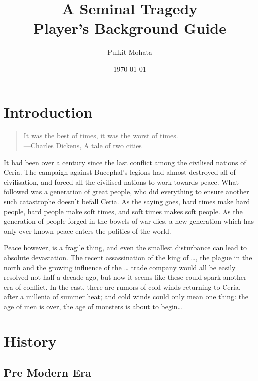 \documentclass[11pt]{article}
\author{Pulkit Mohata}
\date{\today}
\title{A Seminal Tragedy\\\medskip
\large Player's Background Guide}
\begin{document}
\maketitle
\tableofcontents

\section{Introduction}
\label{sec:org875150f}
\begin{quote}
It was the best of times, it was the worst of times. \\
---Charles Dickens, A tale of two cities
\end{quote}
It had been over a century since the last conflict among the civilised nations of Ceria. The campaign against Bucephal's legions had almost destroyed all of civilisation, and forced all the civilised nations to work towards peace. What followed was a generation of great people, who did everything to ensure another such catastrophe doesn't befall Ceria. As the saying goes, hard times make hard people, hard people make soft times, and soft times makes soft people. As the generation of people forged in the bowels of war dies, a new generation which has only ever known peace enters the politics of the world.

Peace however, is a fragile thing, and even the smallest disturbance can lead to absolute devastation. The recent assassination of the king of \ldots{}, the plague in the north and the growing influence of the \ldots{} trade company would all be easily resolved not half a decade ago, but now it seems like these could spark another era of conflict. In the east, there are rumors of cold winds returning to Ceria, after a millenia of summer heat; and cold winds could only mean one thing: the age of men is over, the age of monsters is about to begin\ldots{}
\section{History}
\label{sec:org9b4307f}
\subsection{Pre Modern Era}
\label{sec:org12300a5}
\end{document}
